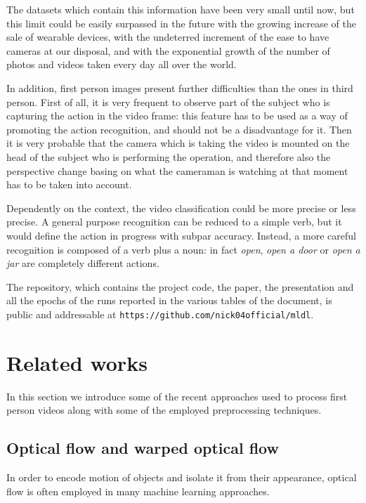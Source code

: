 \documentclass[10pt,twocolumn,letterpaper]{article}
\begin{document}
The datasets which contain this information have been very small until now, but this limit could be easily surpassed in the future with the growing increase of the sale of wearable devices, with the undeterred increment of the ease to have cameras at our disposal, and with the exponential growth of the number of photos and videos taken every day all over the world. 

In addition, first person images present further difficulties than the ones in third person. First of all, it is very frequent to observe part of the subject who is capturing the action in the video frame: this feature has to be used as a way of promoting the action recognition, and should not be a disadvantage for it. Then it is very probable that the camera which is taking the video is mounted on the head of the subject who is performing the operation, and therefore also the perspective change basing on what the cameraman is watching at that moment has to be taken into account.

Dependently on the context, the video classification could be more precise or less precise. A general purpose recognition can be reduced to a simple verb, but it would define the action in progress with subpar accuracy. Instead, a more careful recognition is composed of a verb plus a noun: in fact \emph{open}, \emph{open a door} or \emph{open a jar} are completely different actions.

\vspace{8pt}
The repository, which contains the project code, the paper, the presentation and all the epochs of the runs reported in the various tables of the document, is public and addressable at \texttt{https://github.com/nick04official/mldl}.

\section{Related works}

In this section we introduce some of the recent approaches used to process first person videos along with some of the employed preprocessing techniques.

\subsection{Optical flow and warped optical flow}

In order to encode motion of objects and isolate it from their appearance, optical flow is often employed in many machine learning approaches.
\end{document}
